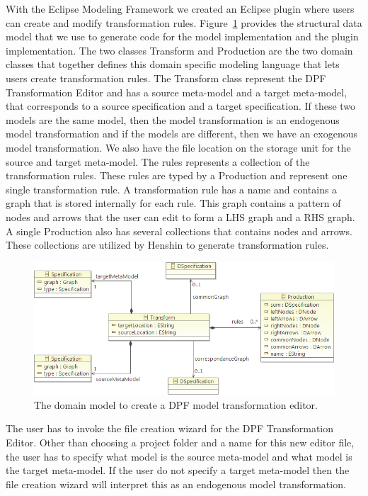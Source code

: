 With the Eclipse Modeling Framework we created an Eclipse plugin where users can
create and modify transformation rules. Figure~\ref{fig:transform_metamodel}
provides the structural data model that we use to generate code for the model
implementation and the plugin implementation. The two classes Transform and
Production are the two domain classes that together defines this domain specific
modeling language that lets users create transformation rules. The Transform
class represent the DPF Transformation Editor and has a source meta-model and a
target meta-model, that corresponds to a source specification and a target
specification. If these two models are the same model, then the model
transformation is an endogenous model transformation and if the models are
different, then we have an exogenous model transformation. We also have the file
location on the storage unit for the source and target meta-model. The rules
represents a collection of the transformation rules. These rules are typed by a
Production and represent one single transformation rule. A transformation
rule has a name and contains a graph that is stored internally for each rule.
This graph contains a pattern of nodes and arrows that the user can edit to
form a LHS graph and a RHS graph. A single Production also has several
collections that contains nodes and arrows. These collections are utilized by
Henshin to generate transformation rules. 

\begin{figure}[H]
	\centering
	\includegraphics[scale=0.8]{./Figures/transform_metamodel_ecore.png}
	\caption[Model for the DPF Transformation Editor]
	{The domain model to create a DPF model transformation editor.}
	\label{fig:transform_metamodel}
\end{figure}

The user has to invoke the file creation wizard for the DPF Transformation Editor.
Other than choosing a project folder and a name for this new editor file, the
user has to specify what model is the source meta-model and what model is the
target meta-model. If the user do not specify a target meta-model then the file
creation wizard will interpret this as an endogenous model transformation.

